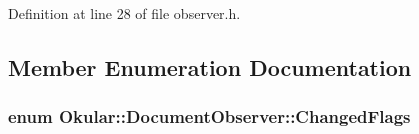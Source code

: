 Definition at line 28 of file observer.\+h.



\subsection{Member Enumeration Documentation}
\hypertarget{classOkular_1_1DocumentObserver_af0e6b09d5fc7ecb673bd4895ef2710dc}{
\subsubsection[{Changed\+Flags}]{\setlength{\rightskip}{0pt plus 5cm}enum {\bf Okular\+::\+Document\+Observer\+::\+Changed\+Flags}}}\label{classOkular_1_1DocumentObserver_af0e6b09d5fc7ecb673bd4895ef2710dc}
